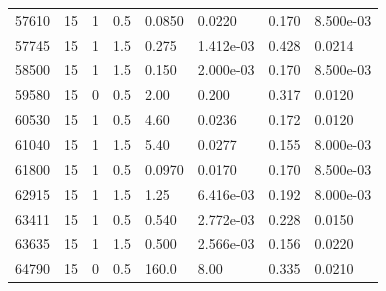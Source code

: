 \documentclass[preview]{standalone}
\begin{document}
{{{\begin{tabular}{L{1.2cm}C{1.2cm} C{0.3cm}C{0.5cm} C{1.4cm}C{1.4cm} C{1.4cm}C{1.4cm}}
  57610  &    15  & 1     & 0.5 &  0.0850  & 0.0220  & 0.170 &  8.500e-03   \\ 
  57745  &    15  & 1     & 1.5 &  0.275  & 1.412e-03  & 0.428 &  0.0214   \\ 
  58500  &    15  & 1     & 1.5 &  0.150  & 2.000e-03  & 0.170 &  8.500e-03   \\ 
  59580  &    15  & 0     & 0.5 &  2.00  & 0.200  & 0.317 &  0.0120   \\ 
  60530  &    15  & 1     & 0.5 &  4.60  & 0.0236  & 0.172 &  0.0120   \\ 
  61040  &    15  & 1     & 1.5 &  5.40  & 0.0277  & 0.155 &  8.000e-03   \\ 
  61800  &    15  & 1     & 0.5 &  0.0970  & 0.0170  & 0.170 &  8.500e-03   \\ 
  62915  &    15  & 1     & 1.5 &  1.25  & 6.416e-03  & 0.192 &  8.000e-03   \\ 
  63411  &    15  & 1     & 0.5 &  0.540  & 2.772e-03  & 0.228 &  0.0150   \\ 
  63635  &    15  & 1     & 1.5 &  0.500  & 2.566e-03  & 0.156 &  0.0220   \\ 
  64790  &    15  & 0     & 0.5 &  160.0  & 8.00  & 0.335 &  0.0210   \\ 
\hline 
\end{tabular} 

}}}
\end{document}
